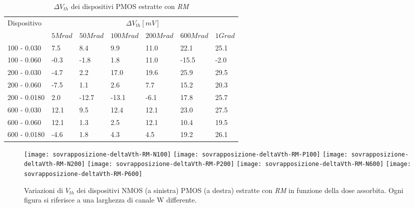 \begin{table}[H]
  \renewcommand{\arraystretch}{1.3}
  \begin{tabular}{m{2.1cm}  m{1.1cm} m{1.3cm} m{1.5cm} m{1.5cm} m{1.5cm} m{1cm}}
    \toprule
    \multirow{2}{*}{Dispositivo} & \multicolumn{6}{c}{$\Delta V_{th} [mV] $}                                                          \\
    \cmidrule{2-7}
                                 & $5Mrad$                                   & $50Mrad$ & $100Mrad$ & $200Mrad$ & $600Mrad$ & $1Grad$ \\
    \midrule
    100 - 0.030                     & 7.5                                       & 8.4      & 9.9       & 11.0      & 22.1      & 25.1    \\
    \hline
    100 - 0.060                     & -0.3                                      & -1.8     & 1.8       & 11.0      & -15.5     & -2.0    \\
    \hline
    200 - 0.030                     & -4.7                                      & 2.2      & 17.0      & 19.6      & 25.9      & 29.5    \\
    \hline
    200 - 0.060                     & -7.5                                      & 1.1      & 2.6       & 7.7       & 15.2      & 20.3    \\
    \hline
    200 - 0.0180                    & 2.0                                       & -12.7    & -13.1     & -6.1      & 17.8      & 25.7    \\
    \hline
    600 - 0.030                     & 12.1                                      & 9.5      & 12.4      & 12.1      & 23.0      & 27.5    \\
    \hline
    600 - 0.060                     & 12.1                                      & 1.3      & 2.5       & 12.1      & 10.4      & 19.5    \\
    \hline
    600 - 0.0180                    & -4.6                                      & 1.8      & 4.3       & 4.5       & 19.2      & 26.1    \\
    \bottomrule
  \end{tabular}
  \caption{$\Delta V_{th}$ dei dispositivi PMOS estratte con \emph{RM}}
  \label{tab:deltaVthRMP}
\end{table}

\begin{figure}[H]
  \centering
  \texttt{[image: sovrapposizione-deltaVth-RM-N100]}
  \texttt{[image: sovrapposizione-deltaVth-RM-P100]}
  \texttt{[image: sovrapposizione-deltaVth-RM-N200]}
  \texttt{[image: sovrapposizione-deltaVth-RM-P200]}
  \texttt{[image: sovrapposizione-deltaVth-RM-N600]}
  \texttt{[image: sovrapposizione-deltaVth-RM-P600]}
  \caption{Variazioni di $V_{th}$ dei dispositivi NMOS (a sinistra) PMOS (a destra) estratte con \emph{RM} in funzione della dose assorbita. Ogni figura si riferisce a una larghezza di canale W differente.}
  
\end{figure}